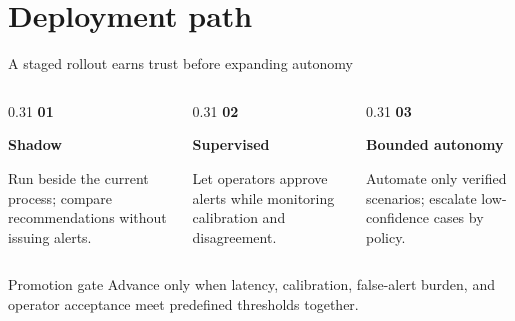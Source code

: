 \section{Deployment path}

\begin{frame}{A staged rollout earns trust before expanding autonomy}
  \begin{columns}[T,onlytextwidth]
    \begin{column}{0.31\textwidth}
      \centering
      {\Large\bfseries 01}\par
      \vspace{0.15cm}
      \textbf{Shadow}\par
      \small Run beside the current process; compare recommendations without issuing alerts.
    \end{column}
    \begin{column}{0.31\textwidth}
      \centering
      {\Large\bfseries 02}\par
      \vspace{0.15cm}
      \textbf{Supervised}\par
      \small Let operators approve alerts while monitoring calibration and disagreement.
    \end{column}
    \begin{column}{0.31\textwidth}
      \centering
      {\Large\bfseries 03}\par
      \vspace{0.15cm}
      \textbf{Bounded autonomy}\par
      \small Automate only verified scenarios; escalate low-confidence cases by policy.
    \end{column}
  \end{columns}

  \vfill
  \begin{exampleblock}{Promotion gate}
    Advance only when latency, calibration, false-alert burden, and operator acceptance meet predefined thresholds together.
  \end{exampleblock}
\end{frame}

